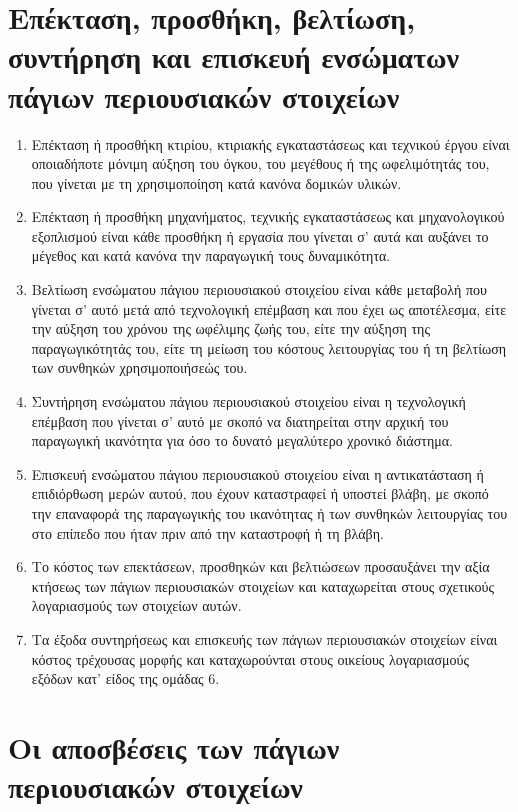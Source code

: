 \documentclass[A4,10pt,greek]{book}
\begin{document}
\section{Επέκταση, προσθήκη, βελτίωση, συντήρηση και επισκευή ενσώματων πάγιων περιουσιακών στοιχείων}
\begin{enumerate}
\item Επέκταση ή προσθήκη κτιρίου, κτιριακής εγκαταστάσεως και τεχνικού έργου είναι οποιαδήποτε μόνιμη αύξηση του όγκου, του μεγέθους ή της ωφελιμότητάς του, που γίνεται με τη χρησιμοποίηση κατά κανόνα δομικών υλικών.

\item Επέκταση ή προσθήκη μηχανήματος, τεχνικής εγκαταστάσεως και μηχανολογικού εξοπλισμού είναι κάθε προσθήκη ή εργασία που γίνεται σ' αυτά και αυξάνει το μέγεθος και κατά κανόνα την παραγωγική τους δυναμικότητα.

\item Βελτίωση ενσώματου πάγιου περιουσιακού στοιχείου είναι κάθε μεταβολή που γίνεται σ' αυτό μετά από τεχνολογική επέμβαση και που έχει ως αποτέλεσμα, είτε την αύξηση του χρόνου της ωφέλιμης ζωής του, είτε την αύξηση της παραγωγικότητάς του, είτε τη μείωση του κόστους λειτουργίας του ή τη βελτίωση των συνθηκών χρησιμοποιήσεώς του.

\item Συντήρηση ενσώματου πάγιου περιουσιακού στοιχείου είναι η τεχνολογική επέμβαση που γίνεται σ' αυτό με σκοπό να διατηρείται στην αρχική του παραγωγική ικανότητα για όσο το δυνατό μεγαλύτερο χρονικό διάστημα.

\item Επισκευή ενσώματου πάγιου περιουσιακού στοιχείου είναι η αντικατάσταση ή επιδιόρθωση μερών αυτού, που έχουν καταστραφεί ή υποστεί βλάβη, με σκοπό την επαναφορά της παραγωγικής του ικανότητας ή των συνθηκών λειτουργίας του στο επίπεδο που ήταν πριν από την καταστροφή ή τη βλάβη.

\item Το κόστος των επεκτάσεων, προσθηκών και βελτιώσεων προσαυξάνει την αξία κτήσεως των πάγιων περιουσιακών στοιχείων και καταχωρείται στους σχετικούς λογαριασμούς των στοιχείων αυτών.

\item Τα έξοδα συντηρήσεως και επισκευής των πάγιων περιουσιακών στοιχείων είναι κόστος τρέχουσας μορφής και καταχωρούνται στους οικείους λογαριασμούς εξόδων κατ' είδος της ομάδας 6.
\end{enumerate}

\section{Οι αποσβέσεις των πάγιων περιουσιακών στοιχείων}
\end{document}
